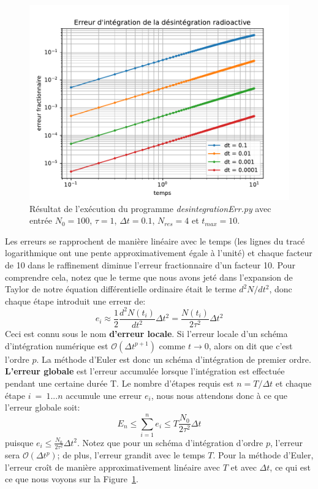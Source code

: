 \documentclass[%
oneside,                 %
final,                   %
10pt]{article}
\begin{document}
\begin{figure}[!ht]  %
  \centerline{\includegraphics[width=0.7\linewidth]{scripts/desintegrationErr.pdf}}
  \caption{
  Résultat de l'exécution du programme \emph{desintegrationErr.py} avec entrée $N_0 = 100$, $\tau = 1$, $\Delta t = 0.1$, $N_{res}=4$ et $t_{max} = 10$. \label{figout:desintegrationErr}
  }
\end{figure}


Les erreurs se rapprochent de manière linéaire avec le temps (les lignes du tracé logarithmique ont une pente approximativement égale à l'unité) et chaque facteur de 10 dans le raffinement diminue l'erreur fractionnaire d'un facteur 10. Pour comprendre cela, notez que le terme que nous avons jeté dans l'expansion de Taylor de notre équation différentielle ordinaire était le terme $d^2 N / d t^2 $, donc chaque étape introduit une erreur de:
\begin{equation}
e_i \approx \frac{1}{2} \frac{d^2 N(t_i)}{d t^2} \Delta t^2 = \frac{N(t_i)}{2 \tau^2} \Delta t^2
\label{eq:local_erreur}
\end{equation}
Ceci est connu sous le nom \textbf{d'erreur locale}. Si l'erreur locale d'un schéma d'intégration numérique est $\mathcal{O}(\Delta t^{p + 1})$ comme $t \rightarrow 0$, alors on dit que c'est l'ordre $p$. La méthode d’Euler est donc un schéma d’intégration de premier ordre. \textbf{L'erreur globale} est l'erreur accumulée lorsque l'intégration est effectuée pendant une certaine durée T. Le nombre d'étapes requis est $n = T / \Delta t$ et chaque étape $i~=~1...n$ accumule une erreur $e_i$, nous nous attendons donc à ce que l'erreur globale soit:
\begin{equation}
E_n \le \sum_{i=1}^n e_i \le T \frac{N_0}{2 \tau^2} \Delta t
\label{eq:global_erreur}
\end{equation}
puisque $e_i \le \frac{N_0}{2 \tau^2} \Delta t^2$. Notez que pour un schéma d’intégration d'ordre $p$, l'erreur sera $\mathcal{O}(\Delta t^{p})$; de plus, l'erreur grandit avec le temps $T$. Pour la méthode d'Euler, l'erreur croît de manière approximativement linéaire avec $T$ et avec $\Delta t$, ce qui est ce que nous voyons sur la Figure~\ref{figout:desintegrationErr}.
\end{document}
